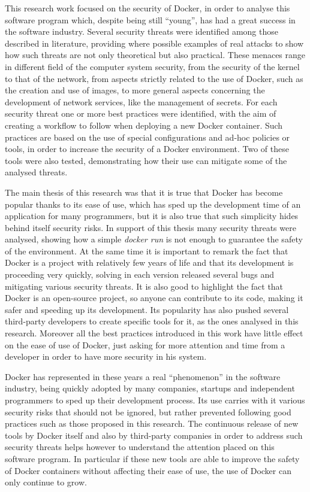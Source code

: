 \documentclass[a4paper,12pt]{article}
\begin{document}
This research work focused on the security of Docker, in order to analyse this
software program which, despite being still ``young'', has had a great success
in the software industry. Several security threats were identified among those
described in literature, providing where possible examples of real attacks to
show how such threats are not only theoretical but also practical. These menaces
range in different field of the computer system security, from the security of
the kernel to that of the network, from aspects strictly related to the use of
Docker, such as the creation and use of images, to more general aspects
concerning the development of network services, like the management of secrets.
For each security threat one or more best practices were identified, with the
aim of creating a workflow to follow when deploying a new Docker container. Such
practices are based on the use of special configurations and ad-hoc policies or
tools, in order to increase the security of a Docker environment. Two of these
tools were also tested, demonstrating how their use can mitigate some of the
analysed threats. \par The main thesis of this research was that it is true that
Docker has become popular thanks to its ease of use, which has sped up the
development time of an application for many programmers, but it is also true
that such simplicity hides behind itself security risks. In support of this
thesis many security threats were analysed, showing how a simple \textit{docker
run} is not enough to guarantee the safety of the environment. At the same time
it is important to remark the fact that Docker is a project with relatively few
years of life and that its development is proceeding very quickly, solving in
each version released several bugs and mitigating various security threats. It
is also good to highlight the fact that Docker is an open-source project, so
anyone can contribute to its code, making it safer and speeding up its
development. Its popularity has also pushed several third-party developers to
create specific tools for it, as the ones analysed in this research. Moreover
all the best practices introduced in this work have little effect on the ease of
use of Docker, just asking for more attention and time from a developer in order
to have more security in his system. \par Docker has represented in these years
a real ``phenomenon'' in the software industry, being quickly adopted by many
companies, startups and independent programmers to sped up their development
process. Its use carries with it various security risks that should not be
ignored, but rather prevented following good practices such as those proposed in
this research. The continuous release of new tools by Docker itself and also by
third-party companies in order to address such security threats helps however to
understand the attention placed on this software program. In particular if these
new tools are able to improve the safety of Docker containers without affecting
their ease of use, the use of Docker can only continue to grow.
\end{document}
